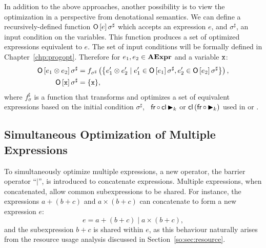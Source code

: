 In addition to the above approaches, another possibility is to view the
optimization in a perspective from denotational semantics.  We can define
a recursively-defined function $\operatorname{\mathsf{O}}\left[e\right]\sigma^\sharp$ which accepts an
expression $e$, and $\sigma^\sharp$, an input condition on the variables.  This
function produces a set of optimized expressions equivalent to $e$.  The set
of input conditions will be formally defined in Chapter~\ref{chp:progopt}.
Therefore for $e_1, e_2 \in \mathbf{AExpr}$ and a variable $\texttt{x}$:
\begin{equation}
    \begin{aligned}
        \operatorname{\mathsf{O}}\left[e_1 \otimes e_2\right]\sigma^\sharp &=
        f_{\sigma^\sharp} \left(
            \left\{
                e^\prime_1 \otimes e^\prime_2 \mid
                e^\prime_1 \in \operatorname{\mathsf{O}}\left[e_1\right]\sigma^\sharp,
                e^\prime_2 \in \operatorname{\mathsf{O}}\left[e_2\right]\sigma^\sharp
            \right\}
        \right), \\
        \operatorname{\mathsf{O}}\left[\texttt{x}\right]\sigma^\sharp &= \{\texttt{x}\},
    \end{aligned}
\end{equation}
where $f_\sigma^\sharp$ is a function that transforms and optimizes a set
of equivalent expressions based on the initial condition $\sigma^\sharp$,
\eg~$\operatorname{\mathsf{fr}} \circ \operatorname{\mathsf{cl}} \operatorname{\blacktriangleright}_k$ or $\operatorname{\mathsf{cl}} \left(\operatorname{\mathsf{fr}} \circ
\operatorname{\blacktriangleright}_k\right)$ used in \frontiertrace{} or \greedytrace{}.


\subsection{Simultaneous Optimization of Multiple Expressions}
\label{so:sub:multiple_expressions}

To simultaneously optimize multiple expressions, a new operator, the barrier
operator ``$\mid$'', is introduced to concatenate expressions.  Multiple
expressions, when concatenated, allow common subexpressions to be shared.  For
instance, the expressions $a + (b + c)$ and $a \times (b + c)$ can concatenate
to form a new expression $e$:
\begin{equation}
    e = a + (b + c) \mid a \times (b + c),
\end{equation}
and the subexpression $b + c$ is shared within $e$, as this behaviour
naturally arises from the resource usage analysis discussed in
Section~\ref{so:sec:resource}.

